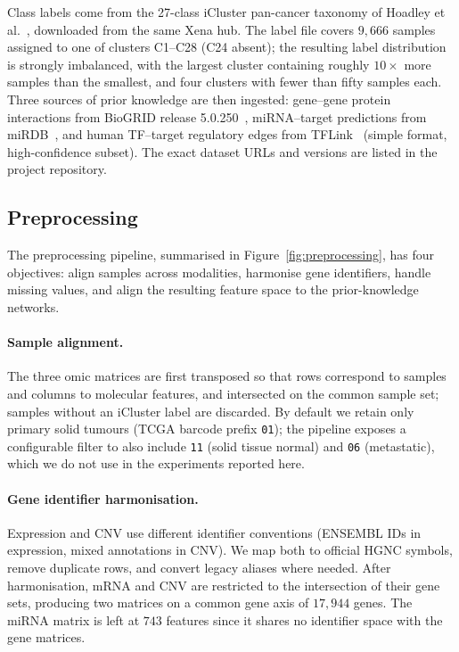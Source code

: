 \documentclass[review,3p,times,11pt, ]{elsarticle} %
\begin{document}
Class labels come from the 27-class iCluster pan-cancer taxonomy of
Hoadley et al.~\cite{Hoadley2018CellOfOriginPanCan}, downloaded from the
same Xena hub. The label file covers $9{,}666$ samples assigned to one
of clusters C1--C28 (C24 absent); the resulting label distribution is
strongly imbalanced, with the largest cluster containing roughly
$10\times$ more samples than the smallest, and four clusters with fewer
than fifty samples each. Three sources of prior knowledge are then
ingested: gene--gene protein interactions from BioGRID release
5.0.250~\cite{stark_biogrid_2006}, miRNA--target predictions from
miRDB~\cite{chen_mirdb_2020}, and human TF--target regulatory edges from
TFLink~\cite{liska_tflink_2022} (simple format, high-confidence subset).
The exact dataset URLs and versions are listed in the project repository.

\subsection{Preprocessing}
\label{ssec:preprocessing}

The preprocessing pipeline, summarised in
Figure~\ref{fig:preprocessing}, has four objectives: align samples
across modalities, harmonise gene identifiers, handle missing values,
and align the resulting feature space to the prior-knowledge networks.

\paragraph{Sample alignment.}
The three omic matrices are first transposed so that rows correspond to
samples and columns to molecular features, and intersected on the
common sample set; samples without an iCluster label are discarded. By
default we retain only primary solid tumours (TCGA barcode prefix
\texttt{01}); the pipeline exposes a configurable filter to also include
\texttt{11} (solid tissue normal) and \texttt{06} (metastatic), which we
do not use in the experiments reported here.

\paragraph{Gene identifier harmonisation.}
Expression and CNV use different identifier conventions
(ENSEMBL IDs in expression, mixed annotations in CNV). We map both to
official HGNC symbols, remove duplicate rows, and convert legacy aliases
where needed. After harmonisation, mRNA and CNV are restricted to the
intersection of their gene sets, producing two matrices on a common
gene axis of $17{,}944$ genes. The miRNA matrix is left at $743$
features since it shares no identifier space with the gene matrices.
\end{document}
